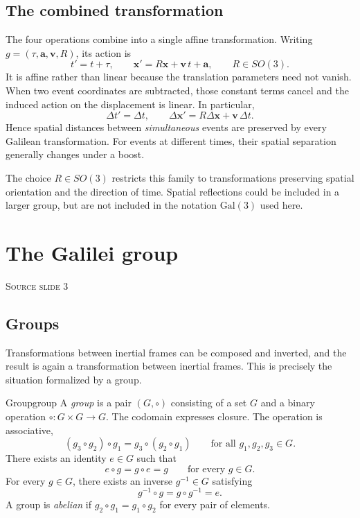 \documentclass[11pt,a4paper]{article}
\newcommand{\vect}[1]{\bm{#1}}
\newcommand{\slideref}[1]{%
  \par\smallskip
  {\footnotesize\color{ink!60}\textsc{Source slide #1}}\par
}
\begin{document}
\subsection{The combined transformation}

The four operations combine into a single affine transformation. Writing
\(g=(\tau,\vect a,\vect v,R)\), its action is
\[
  t'=t+\tau,\qquad
  \vect{x}'=R\vect{x}+\vect{v}\,t+\vect{a},
  \qquad R\in SO(3).
\]
It is affine rather than linear because the translation parameters need not
vanish. When two event coordinates are subtracted, those constant terms cancel
and the induced action on the displacement is linear.
In particular,
\[
  \Delta t'=\Delta t,\qquad
  \Delta\vect{x}'=R\Delta\vect{x}+\vect v\,\Delta t.
\]
Hence spatial distances between \emph{simultaneous} events are preserved by
every Galilean transformation. For events at different times, their spatial
separation generally changes under a boost.

The choice \(R\in SO(3)\) restricts this family to transformations preserving
spatial orientation and the direction of time. Spatial reflections could be
included in a larger group, but are not included in the notation
\(\mathrm{Gal}(3)\) used here.

\section{The Galilei group}
\slideref{3}

\subsection{Groups}

Transformations between inertial frames can be composed and inverted, and the
result is again a transformation between inertial frames. This is precisely
the situation formalized by a group.

\begin{definition}{Group}{group}
A \emph{group} is a pair \((G,\circ)\) consisting of a set \(G\) and a binary
operation \(\circ:G\times G\to G\). The codomain expresses closure. The
operation is associative,
\[
  (g_3\circ g_2)\circ g_1=g_3\circ(g_2\circ g_1)
  \qquad\text{for all }g_1,g_2,g_3\in G.
\]
There exists an identity \(e\in G\) such that
\[
  e\circ g=g\circ e=g
  \qquad\text{for every }g\in G.
\]
For every \(g\in G\), there exists an inverse \(g^{-1}\in G\) satisfying
\[
  g^{-1}\circ g=g\circ g^{-1}=e.
\]
A group is \emph{abelian} if \(g_2\circ g_1=g_1\circ g_2\) for every pair of
elements.
\end{definition}
\end{document}

